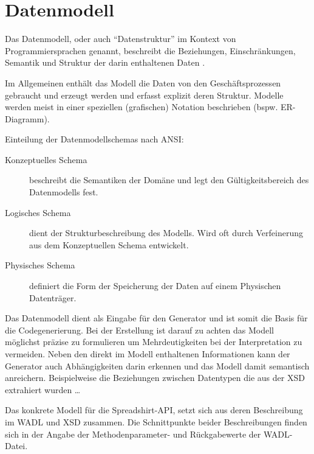 \chapter{Datenmodell}

\begin{thesisDefinition}[Datenmodell]
Das Datenmodell, oder auch \enquote{Datenstruktur} im Kontext von Programmiersprachen genannt, beschreibt die Beziehungen, Einschränkungen, Semantik und Struktur der darin enthaltenen Daten \cite{wiki:datamodel}.
\end{thesisDefinition}

Im Allgemeinen enthält das Modell die Daten von den Geschäftsprozessen gebraucht und erzeugt werden und erfasst explizit deren Struktur. Modelle werden meist in einer speziellen (grafischen) Notation beschrieben (bspw. ER-Diagramm). 

Einteilung der Datenmodellschemas nach ANSI: %
\begin{description}
    \item[Konzeptuelles Schema]
        beschreibt die Semantiken der Domäne und legt den Gültigkeitsbereich des Datenmodells fest.
    \item[Logisches Schema]
        dient der Strukturbeschreibung des Modells. Wird oft durch Verfeinerung aus dem Konzeptuellen Schema entwickelt.
    \item[Physisches Schema]
        definiert die Form der Speicherung der Daten auf einem Physischen Datenträger.
\end{description}

Das Datenmodell dient als Eingabe für den Generator und ist somit die Basis für die Codegenerierung. Bei der Erstellung ist darauf zu achten das Modell möglichst präzise zu formulieren um Mehrdeutigkeiten bei der Interpretation zu vermeiden. 
Neben den direkt im Modell enthaltenen Informationen kann der Generator auch Abhängigkeiten darin erkennen und das Modell damit semantisch anreichern. Beispielweise die Beziehungen zwischen Datentypen die aus der \gls{XSD} extrahiert wurden \ldots


Das konkrete Modell für die Spreadshirt-API, setzt sich aus deren Beschreibung im \gls{WADL} und \gls{XSD} zusammen. Die Schnittpunkte beider Beschreibungen finden sich in der Angabe der Methodenparameter- und Rückgabewerte der \gls{WADL}-Datei. 

